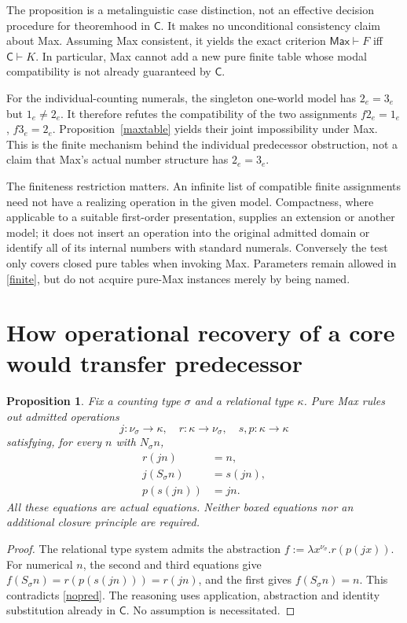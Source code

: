 \documentclass[11pt]{article}
\newcommand{\C}{\mathsf C}
\newcommand{\Max}{\mathsf{Max}}
\newtheorem{proposition}{Proposition}
\begin{document}
The proposition is a metalinguistic case distinction, not an effective decision procedure for theoremhood in $\C$. It makes no unconditional consistency claim about Max. Assuming Max consistent, it yields the exact criterion $\Max\vdash F$ iff $\C\vdash K$. In particular, Max cannot add a new pure finite table whose modal compatibility is not already guaranteed by $\C$.

For the individual-counting numerals, the singleton one-world model has $2_e=3_e$ but $1_e\ne2_e$. It therefore refutes the compatibility of the two assignments $f2_e=1_e$, $f3_e=2_e$. Proposition~\ref{maxtable} yields their joint impossibility under Max. This is the finite mechanism behind the individual predecessor obstruction, not a claim that Max's actual number structure has $2_e=3_e$.

The finiteness restriction matters. An infinite list of compatible finite assignments need not have a realizing operation in the given model. Compactness, where applicable to a suitable first-order presentation, supplies an extension or another model; it does not insert an operation into the original admitted domain or identify all of its internal numbers with standard numerals. Conversely the test only covers closed pure tables when invoking Max. Parameters remain allowed in \eqref{finite}, but do not acquire pure-Max instances merely by being named.

\section{How operational recovery of a core would transfer predecessor}

\begin{proposition}\label{recovery}
Fix a counting type $\sigma$ and a relational type $\kappa$. Pure Max rules out admitted operations
\[
 j:\nu_\sigma\to\kappa,\quad r:\kappa\to\nu_\sigma,
 \quad s,p:\kappa\to\kappa
\]
satisfying, for every $n$ with $N_\sigma n$,
\begin{align*}
 r(jn)&=n,\\
 j(S_\sigma n)&=s(jn),\\
 p(s(jn))&=jn.
\end{align*}
All these equations are actual equations. Neither boxed equations nor an additional closure principle are required.
\end{proposition}
\begin{proof}
The relational type system admits the abstraction
$f:=\lambda x^{\nu_\sigma}.r(p(jx))$.
For numerical $n$, the second and third equations give
$f(S_\sigma n)=r(p(s(jn)))=r(jn)$, and the first gives $f(S_\sigma n)=n$.
This contradicts \eqref{nopred}. The reasoning uses application, abstraction and identity substitution already in $\C$. No assumption is necessitated.
\end{proof}
\end{document}
